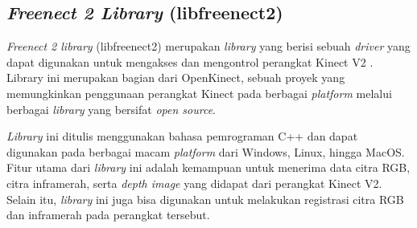 \subsection{\emph{Freenect 2 Library} (libfreenect2)}
\label{subsec:libfreenect2}

\emph{Freenect 2 library} (libfreenect2) merupakan \emph{library} yang berisi sebuah \emph{driver} yang dapat digunakan untuk mengakses dan mengontrol perangkat Kinect V2 \citep{sft:libfreenect2}.
Library ini merupakan bagian dari OpenKinect, sebuah proyek yang memungkinkan penggunaan perangkat Kinect pada berbagai \emph{platform} melalui berbagai \emph{library} yang bersifat \emph{open source}.

\emph{Library} ini ditulis menggunakan bahasa pemrograman C++ dan dapat digunakan pada berbagai macam \emph{platform} dari Windows, Linux, hingga MacOS.
Fitur utama dari \emph{library} ini adalah kemampuan untuk menerima data citra RGB, citra inframerah, serta \emph{depth image} yang didapat dari perangkat Kinect V2.
Selain itu, \emph{library} ini juga bisa digunakan untuk melakukan registrasi citra RGB dan inframerah pada perangkat tersebut.
